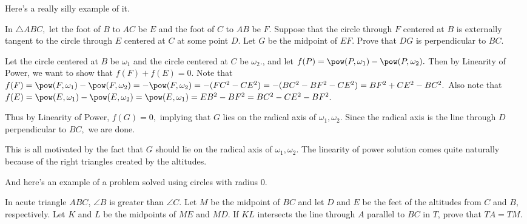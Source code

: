 Here's a really silly example of it.
\begin{exam}
In $\triangle ABC,$ let the foot of $B$ to $AC$ be $E$ and the foot of $C$ to $AB$ be $F.$ Suppose that the circle through $F$ centered at $B$ is externally tangent to the circle through $E$ centered at $C$ at some point $D.$ Let $G$ be the midpoint of $EF.$ Prove that $DG$ is perpendicular to $BC.$
\end{exam}

\begin{sol}
Let the circle centered at $B$ be $\omega_1$ and the circle centered at $C$ be $\omega_2.$, and let $f(P)=\pow(P,\omega_1)-\pow(P,\omega_2).$ Then by Linearity of Power, we want to show that $f(F)+f(E)=0.$ Note that $f(F)=\pow(F,\omega_1)-\pow(F,\omega_2)=-\pow(F,\omega_2)=-(FC^2-CE^2)=-(BC^2-BF^2-CE^2)=BF^2+CE^2-BC^2.$ Also note that $f(E)=\pow(E,\omega_1)-\pow(E,\omega_2)=\pow(E,\omega_1)=EB^2-BF^2=BC^2-CE^2-BF^2.$

Thus by Linearity of Power, $f(G)=0,$ implying that $G$ lies on the radical axis of $\omega_1,\omega_2.$ Since the radical axis is the line through $D$ perpendicular to $BC,$ we are done.
\end{sol}

This is all motivated by the fact that $G$ should lie on the radical axis of $\omega_1,\omega_2.$ The linearity of power solution comes quite naturally because of the right triangles created by the altitudes.

And here's an example of a problem solved using circles with radius $0.$

\begin{exam}
In acute triangle $ABC$, $\angle B$ is greater than $\angle C$. Let $M$ be the midpoint of $BC$ and let $D$ and $E$ be the feet of the altitudes from $C$ and $B,$ respectively. Let $K$ and $L$ be the midpoints of $ME$ and $MD$. If $KL$ intersects the line through $A$ parallel to $BC$ in $T$, prove that $TA=TM$.
\end{exam}

